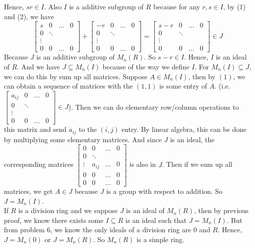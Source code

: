 \documentclass[12pt]{amsart}
\begin{document}
Hence, $sr\in I$. Also $I$ is a additive subgroup of $R$ because for any $r,s\in I$, by (1) and (2), we have 
\[\begin{bmatrix}
    s&0&\dots &0\\
    0&\ddots\\
    \vdots\\
    0&0&\dots&0
\end{bmatrix}+\begin{bmatrix}
    -r&0&\dots &0\\
    0&\ddots\\
    \vdots\\
    0&0&\dots&0
\end{bmatrix}=\begin{bmatrix}
    s-r&0&\dots &0\\
    0&\ddots\\
    \vdots\\
    0&0&\dots&0
\end{bmatrix}\in J\]
Because $J$ is an additive subgroup of $M_n(R)$.
So $s-r\in I$. Hence, $I$ is an ideal of $R$. And we have $J\subseteq M_n(I)$ because of the way we define $I$. For $M_n(I)\subseteq J$, we can do this by sum up all matrices. Suppose $A\in M_n(I)$, then by $(1)$, we can obtain a sequence of matrices with the $(1,1)$ is some entry of $A$. (i.e. $\begin{bmatrix}
    a_{ij}&0&\dots &0\\
    0&\ddots\\
    \vdots\\
    0&0&\dots&0
\end{bmatrix}\in J$). Then we can do elementary row/column operations to this matrix and send $a_{ij}$ to the $(i,j)$ entry. By linear algebra, this can be done by multiplying some elementary matrices. And since $J$ is an ideal, the corresponding matrices $\begin{bmatrix}
    0&0&\dots &0\\
    0&\ddots\\
    \vdots&a_{ij}&\dots &0\\
    0&0&\dots&0\\
    0&0&\dots&0
\end{bmatrix}$ is also in $J$. Then if we sum up all matrices, we get $A\in J$ because $J$ is a group with respect to addition. So $J=M_n(I)$.\\
If $R$ is a division ring and we suppose $J$ is an ideal of $M_n(R)$, then by previous proof, we know there exists some $I\subseteq R$ is an ideal such that $J=M_n(I)$. But from problem 6, we know the only ideals of a division ring are $0$ and $R$. Hence, $J=M_n(0)$ or $J=M_n(R)$. So $M_n(R)$ is a simple ring.\\
\end{document}
